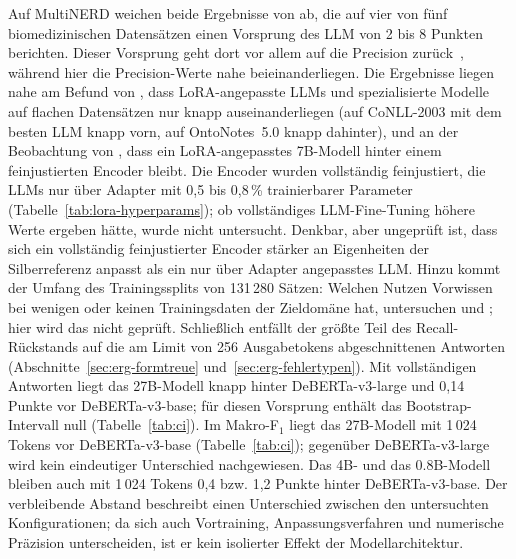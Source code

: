 Auf MultiNERD weichen beide Ergebnisse von \textcite{obeidat2025llm} ab,
die auf vier von fünf biomedizinischen Datensätzen einen Vorsprung des
LLM von 2 bis 8 Punkten berichten.
Dieser Vorsprung geht dort vor allem auf die Precision zurück~\cite[Tab.~III]{obeidat2025llm}, während hier die Precision-Werte
nahe beieinanderliegen.
Die Ergebnisse liegen nahe am Befund von \textcite{zhan2026generativeNER}, dass
LoRA-angepasste LLMs und spezialisierte Modelle auf flachen Datensätzen
nur knapp auseinanderliegen (auf CoNLL-2003 mit dem besten LLM knapp
vorn, auf OntoNotes~5.0 knapp dahinter), und an der
Beobachtung von \textcite{lu2024llmstruggle}, dass ein LoRA-angepasstes
7B-Modell hinter einem feinjustierten Encoder bleibt.
Die Encoder wurden vollständig feinjustiert, die LLMs nur über Adapter
mit 0{,}5 bis 0{,}8\,\% trainierbarer Parameter
(Tabelle~\ref{tab:lora-hyperparams}); ob vollständiges LLM-Fine-Tuning
höhere Werte ergeben hätte, wurde nicht untersucht.
Denkbar, aber ungeprüft ist, dass sich ein vollständig feinjustierter
Encoder stärker an Eigenheiten der Silberreferenz anpasst als ein
nur über Adapter angepasstes LLM.
Hinzu kommt der Umfang des Trainingssplits von 131\,280 Sätzen: Welchen
Nutzen Vorwissen bei wenigen oder keinen Trainingsdaten der Zieldomäne
hat, untersuchen
\textcite{bogdanov2024nuner} und \textcite{zaratiana2024gliner};
hier wird das nicht geprüft.
Schließlich entfällt der größte Teil des Recall-Rückstands auf die am
Limit von 256 Ausgabetokens abgeschnittenen Antworten
(Abschnitte~\ref{sec:erg-formtreue} und~\ref{sec:erg-fehlertypen}).
Mit vollständigen Antworten liegt das 27B-Modell
knapp hinter DeBERTa-v3-large und 0,14 Punkte vor DeBERTa-v3-base; für
diesen Vorsprung enthält das Bootstrap-Intervall null
(Tabelle~\ref{tab:ci}). Im Makro-F$_1$ liegt das 27B-Modell mit
1\,024 Tokens vor DeBERTa-v3-base (Tabelle~\ref{tab:ci}); gegenüber
DeBERTa-v3-large wird kein eindeutiger Unterschied nachgewiesen.
Das 4B- und das 0.8B-Modell bleiben auch mit 1\,024 Tokens 0,4 bzw. 1,2
Punkte hinter DeBERTa-v3-base.
Der verbleibende Abstand beschreibt einen Unterschied zwischen den
untersuchten Konfigurationen; da sich auch Vortraining,
Anpassungsverfahren und numerische Präzision unterscheiden, ist er kein isolierter
Effekt der Modellarchitektur.

